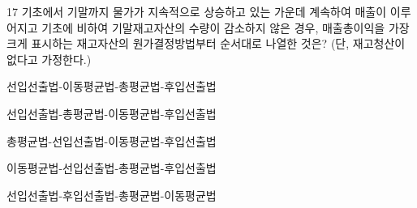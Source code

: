 \begin{question}{17}
기초에서 기말까지 물가가 지속적으로 상승하고 있는 가운데 계속하여 매출이 이루어지고 기초에 비하여 기말재고자산의 수량이 감소하지 않은 경우, 매출총이익을 가장 크게 표시하는 재고자산의 원가결정방법부터 순서대로 나열한 것은? (단, 재고청산이 없다고 가정한다.)
\begin{choices}
  \item 선입선출법-이동평균법-총평균법-후입선출법
  \item 선입선출법-총평균법-이동평균법-후입선출법
  \item 총평균법-선입선출법-이동평균법-후입선출법
  \item 이동평균법-선입선출법-총평균법-후입선출법
  \item 선입선출법-후입선출법-총평균법-이동평균법
\end{choices}
\end{question}
